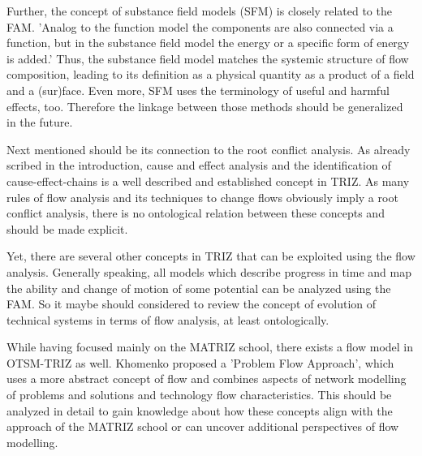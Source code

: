 \documentclass[a4paper,11pt]{article}
\begin{document}
\begin{itemize}
        Further, the concept of substance field models (SFM) is closely related
        to the FAM. 'Analog to the function model the components are also 
        connected via a function, but in the substance field model the energy 
        or a specific form of energy is added.' \cite{KoltzeSouchkov2017} Thus,
        the substance field model matches the systemic structure of flow 
        composition, leading to its definition as a physical quantity as a 
        product of a field and a (sur)face. \cite{Flussdefinition(Physik)}
        Even more, SFM uses the terminology of useful and harmful effects, too.
        \cite{KoltzeSouchkov2017} Therefore the linkage between those methods 
        should be generalized in the future.

        Next mentioned should be its connection to the root conflict analysis. 
        As already scribed in the introduction, cause and effect analysis and 
        the identification of cause-effect-chains is a well described and 
        established concept in TRIZ. As many rules of flow analysis and its
        techniques to change flows obviously imply a root conflict analysis, 
        there is no ontological relation between these concepts and should be 
        made explicit. 
        
        Yet, there are several other concepts in TRIZ that can be exploited 
        using the flow analysis. Generally speaking, all models which describe 
        progress in time and map the ability and change of motion of some 
        potential can be analyzed using the FAM. So it maybe should considered 
        to review the concept of evolution of technical systems in terms of 
        flow analysis, at least ontologically.
        
        While having focused mainly on the MATRIZ school, there exists a flow 
        model in OTSM-TRIZ as well. Khomenko proposed a 'Problem Flow Approach',
        which uses a more abstract concept of flow and combines aspects of 
        network modelling of problems and solutions and technology flow 
        characteristics. \cite{Khomenko2007} \cite{KhomenkoProblemFlowNetworks}
        \cite{KhomenkoTechnologyProblemFlow} \cite{KhomenkoProblemFlowModel}
        This should be analyzed in detail to gain knowledge about how these 
        concepts align with the approach of the MATRIZ school or can uncover 
        additional perspectives of flow modelling.        


\end{itemize}
\end{document}
